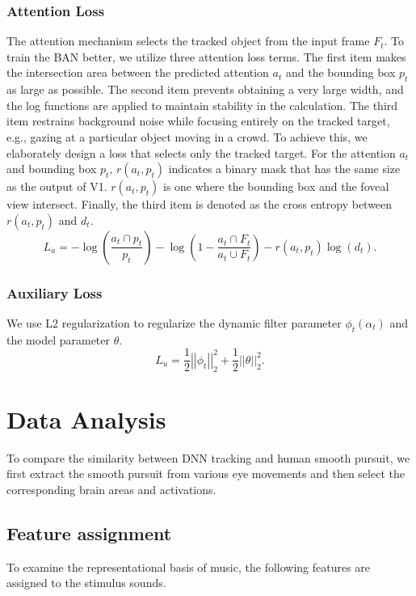 \documentclass[journal]{IEEEtran}
\begin{document}
\subsubsection{Attention Loss}
The attention mechanism selects the tracked object from the input frame $F_t$.
To train the BAN better, we utilize three attention loss terms.
The first item makes the intersection area between the predicted attention $a_t$ and the bounding box $p_t$ as large as possible. 
The second item prevents obtaining a very large width, and the log functions are applied to maintain stability in the calculation. 
The third item restrains background noise while focusing entirely on the tracked target, e.g., gazing at a particular object moving in a crowd. 
To achieve this, we elaborately design a loss that selects only the tracked target.
For the attention $a_t$ and bounding box $p_t$, $r(a_t, p_t)$ indicates a binary mask that has the same size as the output of V1. 
$r(a_t, p_t)$ is one where the bounding box and the foveal view intersect.
Finally, the third item is denoted as the cross entropy between $r(a_t, p_t)$ and $d_t$.
\begin{equation}
	L_a = -\log (\frac{a_t \cap p_t}{p_t}) - \log (1 - \frac{a_t \cap F_t}{a_t \cup F_t})
	- r(a_t, p_t) \log(d_t).
\end{equation}

\subsubsection{Auxiliary Loss}
We use L2 regularization to regularize the dynamic filter parameter $\phi_t(\alpha_t)$ and the model parameter $\theta$.
\begin{equation}
	L_u = \frac{1}{2} \left\vert \left\vert \phi_t \right\vert \right\vert _2 ^2 
	+ \frac{1}{2} \left\vert \left\vert \theta \right\vert \right\vert _2 ^2.
\end{equation}


\section{Data Analysis} \label{sec:data_analysis}
To compare the similarity between DNN tracking and human smooth pursuit, we first extract the smooth pursuit from various eye movements 
and then select the corresponding brain areas and activations. 


\subsection{Feature assignment}
To examine the representational basis of music, the following features are assigned to the stimulus sounds.
\end{document}
